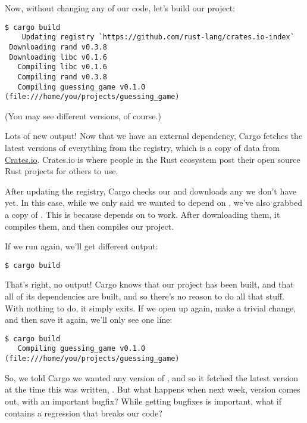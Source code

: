\blank

Now, without changing any of our code, let's build our project:

\begin{verbatim}
$ cargo build
    Updating registry `https://github.com/rust-lang/crates.io-index`
 Downloading rand v0.3.8
 Downloading libc v0.1.6
   Compiling libc v0.1.6
   Compiling rand v0.3.8
   Compiling guessing_game v0.1.0 (file:///home/you/projects/guessing_game)

\end{verbatim}

(You may see different versions, of course.)

\blank

Lots of new output! Now that we have an external dependency, Cargo fetches the latest versions of everything from the registry, 
which is a copy of data from \href{https://crates.io/}{Crates.io}. Crates.io is where people in the Rust ecosystem post their 
open source Rust projects for others to use.

\blank

After updating the registry, Cargo checks our \code{[dependencies]} and downloads any we don't have yet. In this case, while we 
only said we wanted to depend on , we've also grabbed a copy of . This is because  depends on 
 to work. After downloading them, it compiles them, and then compiles our project.

\blank

If we run  again, we'll get different output:

\begin{verbatim}
$ cargo build
\end{verbatim}

That's right, no output! Cargo knows that our project has been built, and that all of its dependencies are built, and so there's 
no reason to do all that stuff. With nothing to do, it simply exits. If we open up  again, make a trivial 
change, and then save it again, we'll only see one line:

\begin{verbatim}
$ cargo build
   Compiling guessing_game v0.1.0 (file:///home/you/projects/guessing_game)
\end{verbatim}

So, we told Cargo we wanted any  version of , and so it fetched the latest version at the time this was
written, . But what happens when next week, version  comes out, with an important bugfix? While getting
bugfixes is important, what if  contains a regression that breaks our code?

